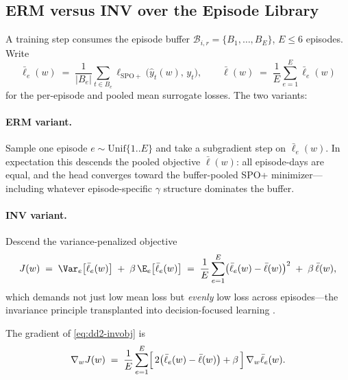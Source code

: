 \subsection{ERM versus INV over the Episode Library}
\label{sec:dd2-erm-inv}

A training step consumes the episode buffer
$\mathcal{B}_{i,r} = \{B_1, \ldots, B_E\}$, $E \le 6$ episodes. Write
\[
\bar\ell_e(w) \;=\; \frac{1}{|B_e|} \sum_{t \in B_e}
\ell_{\mathrm{SPO+}}\bigl(\hat y_t(w),\, y_t\bigr),
\qquad
\bar\ell(w) \;=\; \frac{1}{E} \sum_{e=1}^{E} \bar\ell_e(w)
\]
for the per-episode and pooled mean surrogate losses. The two variants:

\paragraph{ERM variant.} Sample one episode $e \sim \mathrm{Unif}\{1..E\}$
and take a subgradient step on $\bar\ell_e(w)$. In expectation this descends
the pooled objective $\bar\ell(w)$: all episode-days are equal, and the head
converges toward the buffer-pooled SPO+ minimizer---including whatever
episode-specific $\gamma$ structure dominates the buffer.

\paragraph{INV variant.} Descend the variance-penalized objective
\begin{equation}
\label{eq:dd2-invobj}
J(w) \;=\; \Var_e\bigl[\bar\ell_e(w)\bigr] \;+\; \beta\, \E_e\bigl[\bar\ell_e(w)\bigr]
\;=\; \frac{1}{E} \sum_{e=1}^{E} \bigl(\bar\ell_e(w) - \bar\ell(w)\bigr)^2
\;+\; \beta\, \bar\ell(w),
\end{equation}
which demands not just low mean loss but \emph{evenly} low loss across
episodes---the invariance principle transplanted into decision-focused
learning \citep{yan2026invpnco}.

\begin{proposition}
\label{prop:dd2-invgrad}
The gradient of \eqref{eq:dd2-invobj} is
\begin{equation}
\label{eq:dd2-invgrad}
\nabla_w J(w) \;=\; \frac{1}{E} \sum_{e=1}^{E}
\Bigl[\, 2\bigl(\bar\ell_e(w) - \bar\ell(w)\bigr) + \beta \,\Bigr]\,
\nabla_w \bar\ell_e(w).
\end{equation}
\end{proposition}


